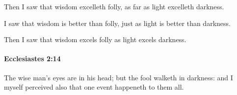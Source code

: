 			\begin{versebox}
					\item[BHS] 
					\item[LXX] 
					\item[ASV] Then I saw that wisdom excelleth folly, as far as light excelleth darkness.
					\item[NIV] I saw that wisdom is better than folly, just as light is better than darkness.
					\item[NRSV] Then I saw that wisdom excels folly as light excels darkness.
			\end{versebox}

		\paragraph{Ecclesiastes 2:14} %
			\label{ECCLESIASTES-2-14}

			The wise man’s eyes are in his head; but the fool walketh in darkness: and I myself perceived also that one event happeneth to them all.

